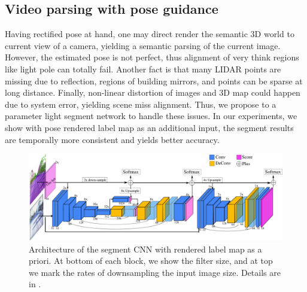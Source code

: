 \subsection{Video parsing with pose guidance}
\label{subsec:parsing}
Having rectified pose at hand, one may direct render the semantic 3D world to current view of a camera, yielding a semantic parsing of the current image. However, the estimated pose is not perfect, thus alignment of very think regions like light pole can totally fail. Another fact is that many LIDAR points are missing due to reflection, \eg regions of building mirrors, and points can be sparse at long distance. Finally, non-linear distortion of images and 3D map could happen due to system error, yielding scene miss alignment. Thus, we propose to a parameter light segment network to handle these issues.
In our experiments, we show with pose rendered label map as an additional input, the segment results are temporally more consistent and yields better accuracy.

\begin{figure}[]
\includegraphics[width=\textwidth]{fig/segCNN.pdf}
\caption{Architecture of the segment CNN with rendered label map as a priori. At bottom of each block, we show the filter size, and at top we mark the rates of downsampling \wrt the input image size. Details are in .}
\label{fig:segnet}
\end{figure}

